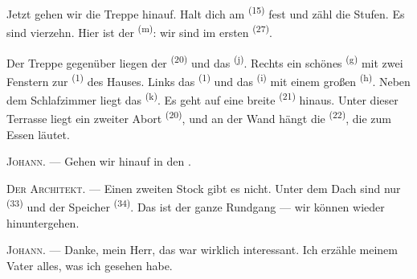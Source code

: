 Jetzt gehen wir die Treppe hinauf. Halt dich am 
\textsuperscript{(15)} fest und zähl die Stufen. Es sind vierzehn. Hier ist der
 \textsuperscript{(m)}: wir sind im ersten 
\textsuperscript{(27)}.

\VUsaut{3.0mm}
\VUsaut{3.0mm}

Der Treppe gegenüber liegen der  \textsuperscript{(20)} und das
 \textsuperscript{(j)}. Rechts ein schönes
 \textsuperscript{(g)} mit zwei Fenstern zur
 \textsuperscript{(1)} des Hauses. Links das
 \textsuperscript{(1)} und das 
\textsuperscript{(i)} mit einem großen  \textsuperscript{(h)}. Neben
dem Schlafzimmer liegt das  \textsuperscript{(k)}. Es geht auf
eine breite  \textsuperscript{(21)} hinaus. Unter dieser Terrasse
liegt ein zweiter Abort \textsuperscript{(20)}, und an der Wand hängt die
 \textsuperscript{(22)}, die zum Essen läutet.

\textsc{Johann}. --- Gehen wir hinauf in den .

\textsc{Der Architekt}. --- Einen zweiten Stock gibt es nicht. Unter dem Dach sind
nur  \textsuperscript{(33)} und der Speicher
\textsuperscript{(34)}. Das ist der ganze Rundgang --- wir können wieder
hinuntergehen.

\textsc{Johann}. --- Danke, mein Herr, das war wirklich interessant. Ich erzähle
meinem Vater alles, was ich gesehen habe.
\VUsaut{4.0mm}
\VUfilet{22mm}
